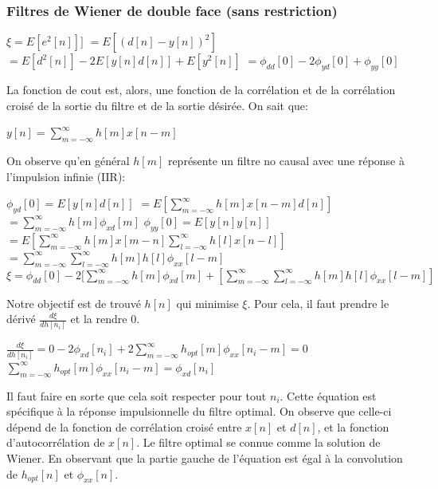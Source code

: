 \documentclass[conference,onecolumn]{IEEEtran}
\begin{document}
\subsubsection{Filtres de Wiener de double face (sans restriction)}
\medskip 
\begin{center}
   $ \xi = E[e^2[n]]]  $
   \medskip 
    $=E[(d[n]-y[n])^2]$
   \medskip 
    $=E[d^2[n]]-2E[y[n]d[n]]+E[y^2[n]]$
   \medskip 
   $=\phi_{dd}[0]- 2 \phi_{yd}[0] + \phi_{yy}[0]$
   \medskip 
\end{center}
La fonction de cout est, alors, une fonction de la corrélation et de la corrélation croisé de la sortie du filtre et de la sortie désirée. On sait que:
    \medskip 
\begin{center}
    $ y[n]= \displaystyle\sum_{m=-\infty}^{\infty}h[m]x[n-m] $
   \medskip 
\end{center}
On observe qu’en général $h[m]$ représente un filtre no causal avec une réponse à l’impulsion infinie (IIR):
\medskip 
\begin{center}
    $ \phi_{yd}[0]=E[y[n]d[n]]  $
   \medskip 
    $=E[\displaystyle\sum_{m=-\infty}^{\infty}h[m]x[n-m]d[n]]$
   \medskip 
   $=\displaystyle\sum_{m=-\infty}^{\infty}h[m]\phi_{xd}[m]$
   \medskip 
    $\phi_{yy}[0]=E[y[n]y[n]]$
   \medskip
    $=E[\displaystyle\sum_{m=-\infty}^{\infty}h[m]x[m-n]\displaystyle\sum_{l=-\infty}^{\infty}h[l]x[n-l]]$
      \medskip
    $=\displaystyle\sum_{m=-\infty}^{\infty}\displaystyle\sum_{l=-\infty}^{\infty}h[m]h[l]\phi_{xx}[l-m]$
        \medskip
    $ \xi = \phi_{dd}[0]-2[\displaystyle\sum_{m=-\infty}^{\infty}h[m]\phi_{xd}[m]+[\displaystyle\sum_{m=-\infty}^{\infty}\displaystyle\sum_{l=-\infty}^{\infty}h[m]h[l]\phi_{xx}[l-m]]$
   \medskip
\end{center}
Notre objectif est de trouvé $h[n]$ qui minimise $\xi$. Pour cela, il faut prendre le dérivé $\frac{d\xi}{dh[n_i]}$ et la rendre 0.
    \medskip 
\begin{center}
    $ \frac{d\xi}{dh[n_i]}=0-2\phi_{xd}[n_i]+2 \displaystyle\sum_{m=-\infty}^{\infty}h_{opt}[m]\phi_{xx}[n_i-m]=0$
   \medskip
    $  \displaystyle\sum_{m=-\infty}^{\infty}h_{opt}[m]\phi_{xx}[n_i-m]=\phi_{xd}[n_i] $
   \medskip
\end{center}
Il faut faire en sorte que cela soit respecter pour tout $n_i$.
\medskip
Cette équation est spécifique à la réponse impulsionnelle du filtre optimal. On observe que celle-ci dépend de la fonction de corrélation croisé entre $x[n]$ et $d[n]$, et la fonction d’autocorrélation de $x[n]$. Le filtre optimal se connue comme la solution de Wiener. En observant que la partie gauche de l’équation est égal à la convolution de $h_{opt}[n]$ et $\phi_{xx}[n]$.
\end{document}
